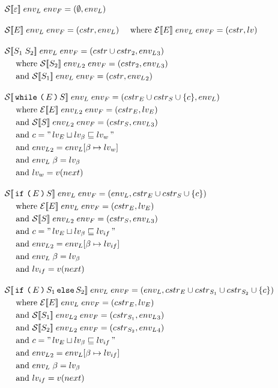 \begin{align*}
& \iS\dblSq{\varepsilon} \; \ienvL \; \ienvF = (\emptyset, \ienvL) \rspace
%
& \iS\dblSq{E} \; \ienvL \; \ienvF = (\icstr, \ienvL) \dsWhere{\iE\dblSq{E} \; \ienvL \; \ienvF = (\icstr, \ilv)} \rspace
%
& \iS\dblSq{S_1 \; S_2} \; \ienvL \; \ienvF = (\icstr \cup \icstr_2, \ienvL_3) \\
& \dsWhere{\iS\dblSq{S_2} \; \ienvL_2 \; \ienvF = (\icstr_2, \ienvL_3)} \\
& \dsAnd{\iS\dblSq{S_1} \; \ienvL \; \ienvF = (\icstr, \ienvL_2)} \rspace
%
& \iS\dblSq{\tk{while} \tk ( E \tk ) S} \; \ienvL \; \ienvF = (\icstr_E \cup \icstr_S \cup \{ c \}, \ienvL) \\
& \dsWhere{\iE\dblSq{E} \; \ienvL_2 \; \ienvF = (\icstr_E, \ilv_E)} \\
& \dsAnd{\iS\dblSq{S} \; \ienvL_2 \; \ienvF = (\icstr_S, \ienvL_3)} \\
& \dsAnd{c = \literal{\ilv_E \sqcup \ilv_\ib \sqsubseteq \ilv_w}} \\
& \dsAnd{\ienvL_2 = \ienvL[\ib \mapsto \ilv_w]} \\
& \dsAnd{\ienvL \; \ib = \ilv_\ib} \\
& \dsAnd{\ilv_w = v(next)} \rspace
%
& \iS\dblSq{\tk{if} \tk ( E \tk ) S} \; \ienvL \; \ienvF = (\ienvL, \icstr_E \cup \icstr_S \cup \{ c \}) \\
& \dsWhere{\iE\dblSq{E} \; \ienvL \; \ienvF = (\icstr_E, \ilv_E)} \\
& \dsAnd{\iS\dblSq{S} \; \ienvL_2 \; \ienvF = (\icstr_S, \ienvL_3)} \\
& \dsAnd{c = \literal{\ilv_E \sqcup \ilv_\ib \sqsubseteq \ilv_{if}}} \\
& \dsAnd{\ienvL_2 = \ienvL[\ib \mapsto \ilv_{if}]} \\
& \dsAnd{\ienvL \; \ib = \ilv_\ib} \\
& \dsAnd{\ilv_{if} = v(next)} \rspace
%
& \iS\dblSq{\tk{if} \tk ( E \tk ) S_1 \tk{else} S_2} \; \ienvL \; \ienvF = (\ienvL, \icstr_E \cup \icstr_{S_1} \cup \icstr_{S_2} \cup \{ c \}) \\
& \dsWhere{\iE\dblSq{E} \; \ienvL \; \ienvF = (\icstr_E, \ilv_E)} \\
& \dsAnd{\iS\dblSq{S_1} \; \ienvL_2 \; \ienvF = (\icstr_{S_1}, \ienvL_3)} \\
& \dsAnd{\iS\dblSq{S_2} \; \ienvL_2 \; \ienvF = (\icstr_{S_2}, \ienvL_4)} \\
& \dsAnd{c = \literal{\ilv_E \sqcup \ilv_\ib \sqsubseteq \ilv_{if}}} \\
& \dsAnd{\ienvL_2 = \ienvL[\ib \mapsto \ilv_{if}]} \\
& \dsAnd{\ienvL \; \ib = \ilv_\ib} \\
& \dsAnd{\ilv_{if} = v(next)}
\end{align*}

